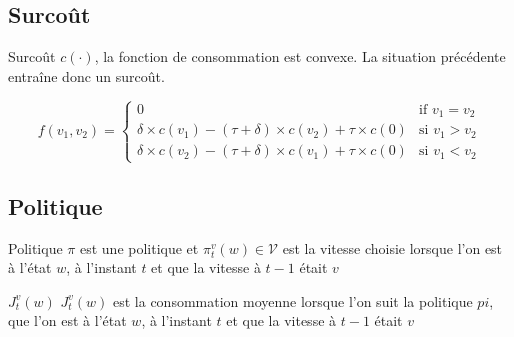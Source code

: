 \documentclass{beamer}
\newcommand{\V}{\mathcal{V}}
\begin{document}
\begin{frame}
  \begin{figure}

  \end{figure}
\end{frame}

\subsection{Surcoût}

\begin{frame}{Surcoût}
  $c(\cdot)$, la fonction de consommation est convexe. La situation
  précédente entraîne donc un surcoût.

  \begin{equation}
    \label{eq:overcost}
    f(v_1,v_2)=
    \begin{cases}
      0 & \mbox{if } v_1=v_2 \\
      \delta\times c(v_1) - (\tau + \delta)\times c(v_2)+\tau\times c(0) & \mbox{si }
      v_1>v_2 \\
      \delta\times c(v_2) - (\tau + \delta)\times c(v_1)+\tau\times c(0) & \mbox{si }
      v_1<v_2
    \end{cases}
  \end{equation}
\end{frame}

\subsection{Politique}

\begin{frame}
  \begin{block}{Politique}
    $\pi$ est une politique et $\pi_t^v(w)\in\V$ est la vitesse
    choisie lorsque l'on est à l'état $w$, à l'instant $t$ et que la
    vitesse à $t-1$ était $v$
  \end{block}

  \begin{block}{$J_t^v(w)$}
    $J_t^v(w)$ est la consommation moyenne lorsque l'on suit la
    politique $pi$, que l'on est à l'état $w$, à l'instant $t$ et que
    la vitesse à $t-1$ était $v$
  \end{block}
  
\end{frame}
\end{document}
